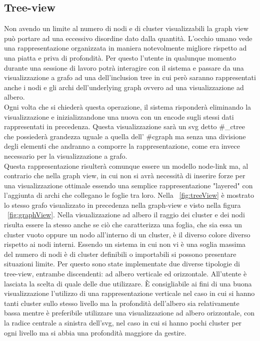 {\subsection{Tree-view}
Non avendo un limite al numero di nodi e di cluster visualizzabili la graph view può portare ad una eccessivo disordine dato dalla quantità. L'occhio umano vede una rappresentazione organizzata in maniera notevolmente migliore rispetto ad una piatta e priva di profondità. Per questo l'utente in qualunque momento durante una sessione di lavoro potrà interagire con il sistema e passare da una visualizzazione a grafo ad una dell'inclusion tree in cui però saranno rappresentati anche i nodi e gli archi dell'underlying graph ovvero ad una visualizzazione ad albero.\\
Ogni volta che si chiederà questa operazione, il sistema risponderà eliminando la visualizzazione e inizializzandone una nuova con un encode sugli stessi dati rappresentati in precedenza. Questa visualizzazione sarà un svg detto \#\_ctree che possiederà grandezza uguale a quella dell' \#cgraph ma senza una divisione degli elementi che andranno a comporre la rappresentazione, come era invece necessario per la visualizzazione a grafo.\\
Questa rappresentazione risulterà comunque essere un modello node-link ma, al contrario che nella graph view, in cui non si avrà necessità di inserire forze per una visualizzazione ottimale essendo una semplice rappresentazione "layered" con l'aggiunta di archi che collegano le foglie tra loro. Nella \figurename~\ref{fig:treeView} è mostrato lo stesso grafo visualizzato in precedenza nella graph-view e visto nella figura \figurename~\ref{fig:graphView}.
Nella visualizzazione ad albero il raggio dei cluster e dei nodi risulta essere la stesso anche se ciò che caratterizza una foglia, che sia essa un cluster vuoto oppure un nodo all'interno di un cluster, è il diverso colore diverso rispetto ai nodi interni.
Essendo un sistema in cui non vi è una soglia massima del numero di nodi è di cluster definibili o importabili si possono presentare situazioni limite. Per questo sono state implementate due diverse tipologie di tree-view, entrambe discendenti: ad albero verticale ed orizzontale.
All'utente è lasciata la scelta di quale delle due utilizzare. È consigliabile ai fini di una buona visualizzazione l'utilizzo di una rappresentazione verticale nel caso in cui si hanno tanti cluster sullo stesso livello ma la profondità dell'albero sia relativamente bassa mentre è preferibile utilizzare una visualizzazione ad albero orizzontale, con la radice centrale a sinistra dell'svg, nel caso in cui si hanno pochi cluster per ogni livello ma si abbia una profondità maggiore da gestire.
}

